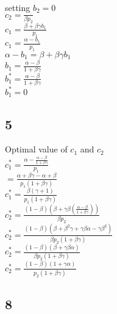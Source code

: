 \documentclass[11pt]{article}
\begin{document}
setting  $b_{2}=0$\\


$c_{2}=\frac{}{\beta p_{2}}$\\



$c_{1}=\frac{\beta+\beta\gamma b_{1}}{p_{1}}$\\

$c_{1}=\frac{\alpha-b_{1}}{p_{1}}$\\

$\alpha-b_{1}=\beta+\beta \gamma b_{1}$\\


$b_{1}=\frac{\alpha-\beta}{1+\beta\gamma}$\\

$b_{1}^{*}=\frac{\alpha-\beta}{1+\beta\gamma}$\\


$b_{1}^{*}=0$\\

\subsection{5}

Optimal value of $c_{1}$ and $c_{2}$\\


$c_{1}^{*}=\frac{\alpha-\frac{\alpha-\beta}{1+\beta \gamma}}{p_{1}}$\\


$=\frac{\alpha+\beta \gamma-\alpha +\beta}{p_{1}(1+\beta \gamma)}$\\


$c_{1}^{*}=\frac{\beta( \gamma +1)}{p_{1}(1+\beta \gamma)}$\\

$c_{2}^{*}=\frac{(1-\beta)(\beta+\gamma \beta (\frac{\alpha-\beta}{1+\beta \gamma}))}{\beta p_{2}}$\\



$c_{2}^{*}=\frac{(1-\beta)(\beta+\beta^{2}\gamma+\gamma\beta\alpha-\gamma\beta^{2})}{\beta p_{2}(1+\beta \gamma)}$\\

$c_{2}^{*}=\frac{(1-\beta)(\beta+\gamma\beta\alpha)}{\beta p_{2}(1+\beta \gamma)}$\\


$c_{2}^{*}=\frac{(1-\beta)(1+\gamma\alpha)}{ p_{2}(1+\beta \gamma)}$\\

\subsection{8}
\end{document}
